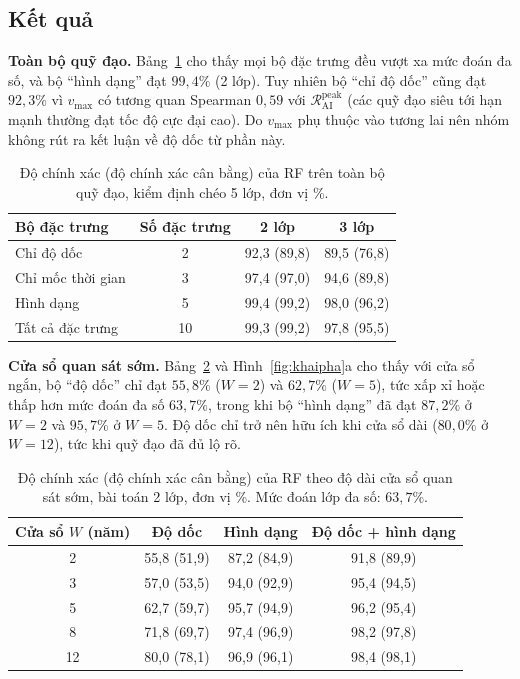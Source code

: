 \documentclass[12pt,a4paper,openany]{report}
\numberwithin{equation}{chapter}   %
\theoremstyle{definition}
\newcommand{\RAI}{\mathcal{R}_{\mathrm{AI}}}
\begin{document}
\subsection{Kết quả}
\textbf{Toàn bộ quỹ đạo.} Bảng~\ref{tab:fulltraj} cho thấy mọi bộ đặc trưng đều vượt xa mức đoán đa số, và bộ ``hình dạng'' đạt $99{,}4\%$ (2 lớp). Tuy nhiên bộ ``chỉ độ dốc'' cũng đạt $92{,}3\%$ vì $v_{\max}$ có tương quan Spearman $0{,}59$ với $\RAI^{\mathrm{peak}}$ (các quỹ đạo siêu tới hạn mạnh thường đạt tốc độ cực đại cao). Do $v_{\max}$ phụ thuộc vào tương lai nên nhóm không rút ra kết luận về độ dốc từ phần này.

\begin{table}[ht]
\centering
\caption{Độ chính xác (độ chính xác cân bằng) của RF trên toàn bộ quỹ đạo, kiểm định chéo 5 lớp, đơn vị \%.}\label{tab:fulltraj}
\begin{tabular}{@{}lccc@{}}
\toprule
\textbf{Bộ đặc trưng} & \textbf{Số đặc trưng} & \textbf{2 lớp} & \textbf{3 lớp}\\
\midrule
Chỉ độ dốc        & 2  & 92,3 (89,8) & 89,5 (76,8)\\
Chỉ mốc thời gian & 3  & 97,4 (97,0) & 94,6 (89,8)\\
Hình dạng         & 5  & 99,4 (99,2) & 98,0 (96,2)\\
Tất cả đặc trưng  & 10 & 99,3 (99,2) & 97,8 (95,5)\\
\bottomrule
\end{tabular}
\end{table}

\textbf{Cửa sổ quan sát sớm.} Bảng~\ref{tab:early} và Hình~\ref{fig:khaipha}a cho thấy với cửa sổ ngắn, bộ ``độ dốc'' chỉ đạt $55{,}8\%$ ($W=2$) và $62{,}7\%$ ($W=5$), tức xấp xỉ hoặc thấp hơn mức đoán đa số $63{,}7\%$, trong khi bộ ``hình dạng'' đã đạt $87{,}2\%$ ở $W=2$ và $95{,}7\%$ ở $W=5$. Độ dốc chỉ trở nên hữu ích khi cửa sổ dài ($80{,}0\%$ ở $W=12$), tức khi quỹ đạo đã đủ lộ rõ.

\begin{table}[ht]
\centering
\caption{Độ chính xác (độ chính xác cân bằng) của RF theo độ dài cửa sổ quan sát sớm, bài toán 2 lớp, đơn vị \%. Mức đoán lớp đa số: $63{,}7\%$.}\label{tab:early}
\begin{tabular}{@{}cccc@{}}
\toprule
\textbf{Cửa sổ $W$ (năm)} & \textbf{Độ dốc} & \textbf{Hình dạng} & \textbf{Độ dốc + hình dạng}\\
\midrule
2  & 55,8 (51,9) & 87,2 (84,9) & 91,8 (89,9)\\
3  & 57,0 (53,5) & 94,0 (92,9) & 95,4 (94,5)\\
5  & 62,7 (59,7) & 95,7 (94,9) & 96,2 (95,4)\\
8  & 71,8 (69,7) & 97,4 (96,9) & 98,2 (97,8)\\
12 & 80,0 (78,1) & 96,9 (96,1) & 98,4 (98,1)\\
\bottomrule
\end{tabular}
\end{table}
\end{document}
